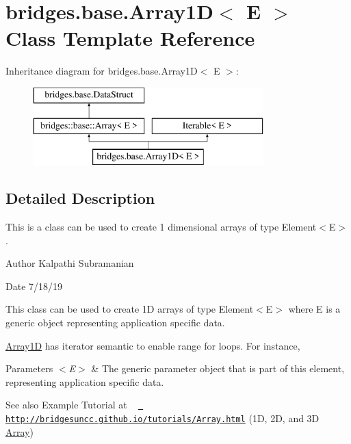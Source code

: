 \hypertarget{classbridges_1_1base_1_1_array1_d}{}\section{bridges.\+base.\+Array1D$<$ E $>$ Class Template Reference}
\label{classbridges_1_1base_1_1_array1_d}
Inheritance diagram for bridges.\+base.\+Array1D$<$ E $>$\+:\begin{figure}[H]
\begin{center}
\leavevmode
\includegraphics[height=3.000000cm]{classbridges_1_1base_1_1_array1_d}
\end{center}
\end{figure}


\subsection{Detailed Description}
This is a class can be used to create 1 dimensional arrays of type Element$<$\+E$>$. 

\begin{DoxyAuthor}{Author}
Kalpathi Subramanian
\end{DoxyAuthor}
\begin{DoxyDate}{Date}
7/18/19
\end{DoxyDate}
This class can be used to create 1D arrays of type Element$<$\+E$>$ where E is a generic object representing application specific data.

\mbox{\hyperlink{classbridges_1_1base_1_1_array1_d}{Array1D}} has iterator semantic to enable range for loops. For instance,


\begin{DoxyCode}{0}
\end{DoxyCode}



\begin{DoxyParams}{Parameters}
{\em $<$\+E$>$} & The generic parameter object that is part of this element, representing application specific data.\\
\hline
\end{DoxyParams}
\begin{DoxySeeAlso}{See also}
Example Tutorial at ~\newline
 \href{http://bridgesuncc.github.io/tutorials/Array.html}{\texttt{ http\+://bridgesuncc.\+github.\+io/tutorials/\+Array.\+html}} (1D, 2D, and 3D \mbox{\hyperlink{classbridges_1_1base_1_1_array}{Array}})~\newline
 
\end{DoxySeeAlso}
